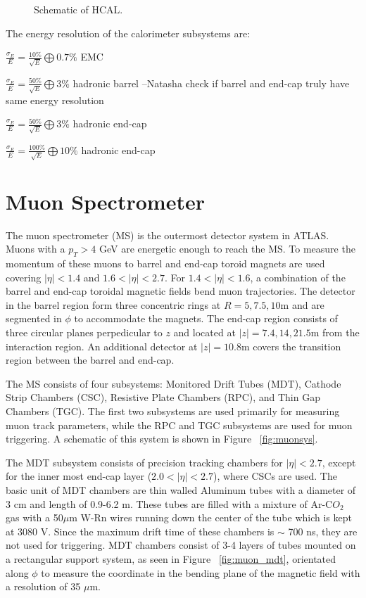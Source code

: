 \begin{figure}[h!]
  \centering
  \caption{Schematic of HCAL.} 
  \label{fig:hcal}
\end{figure}
\FloatBarrier


The energy resolution of the calorimeter subsystems are:

$\frac{\sigma_{E}}{E}=\frac{10\%}{\sqrt{E}}\bigoplus 0.7\%$ EMC

$\frac{\sigma_{E}}{E}=\frac{50\%}{\sqrt{E}}\bigoplus 3\%$ hadronic barrel --Natasha check if barrel and end-cap truly have same energy resolution

$\frac{\sigma_{E}}{E}=\frac{50\%}{\sqrt{E}}\bigoplus 3\%$ hadronic end-cap

$\frac{\sigma_{E}}{E}=\frac{100\%}{\sqrt{E}}\bigoplus 10\%$ hadronic end-cap


\section{Muon Spectrometer}
The muon spectrometer (MS) is the outermost detector system in ATLAS. Muons with a $p_{T}>4$ GeV are energetic enough to reach the MS. To measure the momentum of these muons to barrel and end-cap toroid magnets are used covering $|\eta| < 1.4$ and $1.6<|\eta|<2.7$. For $1.4 < |\eta| < 1.6$, a combination of the barrel and end-cap toroidal magnetic fields bend muon trajectories. The detector in the barrel region form three concentric rings at $R=5, 7.5, 10$m and are segmented in $\phi$ to accommodate the magnets. The end-cap region consists of three circular planes perpedicular to $z$ and located at $|z|=7.4, 14, 21.5$m from the interaction region. An additional detector at $|z|=10.8$m covers the transition region between the barrel and end-cap.

The MS consists of four subsystems: Monitored Drift Tubes (MDT), Cathode Strip Chambers (CSC), Resistive Plate Chambers (RPC), and Thin Gap Chambers (TGC). The first two subsystems are used primarily for measuring muon track parameters, while the RPC and TGC subsystems are used for muon triggering. A schematic of this system is shown in Figure ~\ref{fig:muonsys}. 

The MDT subsystem consists of precision tracking chambers for $|\eta|<2.7$, except for the inner most end-cap layer ($2.0 < |\eta| < 2.7$), where CSCs are used. The basic unit of MDT chambers are thin walled Aluminum tubes with a diameter of 3 cm and length of 0.9-6.2 m. These tubes are filled with a mixture of Ar-C$O_{2}$ gas with a  50$\mu$m W-Rn wires running down the center of the tube which is kept at 3080 V. Since the maximum drift time of these chambers is $\sim$ 700 ns, they are not used for triggering. MDT chambers consist of 3-4 layers of tubes mounted on a rectangular support system, as seen in Figure ~\ref{fig:muon_mdt}, orientated along $\phi$ to measure the coordinate in the bending plane of the magnetic field with a resolution of 35 $\mu$m.

